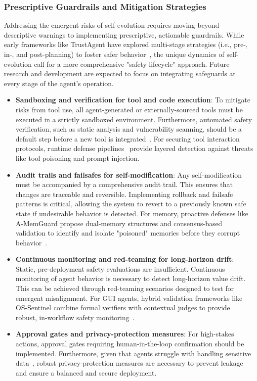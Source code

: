 \subsubsection{Prescriptive Guardrails and Mitigation Strategies}

Addressing the emergent risks of self-evolution requires moving beyond descriptive warnings to implementing prescriptive, actionable guardrails. While early frameworks like TrustAgent have explored multi-stage strategies (i.e., pre-, in-, and post-planning) to foster safer behavior~\citep{hua2024trustagent}, the unique dynamics of self-evolution call for a more comprehensive "safety lifecycle" approach. Future research and development are expected to focus on integrating safeguards at every stage of the agent's operation.

\begin{itemize}
\item \textbf{Sandboxing and verification for tool and code execution}: To mitigate risks from tool use, all agent-generated or externally-sourced tools must be executed in a strictly sandboxed environment. Furthermore, automated safety verification, such as static analysis and vulnerability scanning, should be a default step before a new tool is integrated~\citep{mcpscan}. For securing tool interaction protocols, runtime defense pipelines~\citep{xing2025mcp, wang2025mcpguard} provide layered detection against threats like tool poisoning and prompt injection.
\item \textbf{Audit trails and failsafes for self-modification}: Any self-modification must be accompanied by a comprehensive audit trail. This ensures that changes are traceable and reversible. Implementing rollback and failsafe patterns is critical, allowing the system to revert to a previously known safe state if undesirable behavior is detected. For memory, proactive defenses like A-MemGuard propose dual-memory structures and consensus-based validation to identify and isolate "poisoned" memories before they corrupt behavior~\citep{wang2025unveiling, wei2025memguard}.
\item \textbf{Continuous monitoring and red-teaming for long-horizon drift}: Static, pre-deployment safety evaluations are insufficient. Continuous monitoring of agent behavior is necessary to detect long-horizon value drift. This can be achieved through red-teaming scenarios designed to test for emergent misalignment. For GUI agents, hybrid validation frameworks like OS-Sentinel combine formal verifiers with contextual judges to provide robust, in-workflow safety monitoring~\citep{sun2025sentinel}.
\item \textbf{Approval gates and privacy-protection measures}: For high-stakes actions, approval gates requiring human-in-the-loop confirmation should be implemented. Furthermore, given that agents struggle with handling sensitive data~\citep{zharmagambetov2025agentdam}, robust privacy-protection measures are necessary to prevent leakage and ensure a balanced and secure deployment.
\end{itemize}

